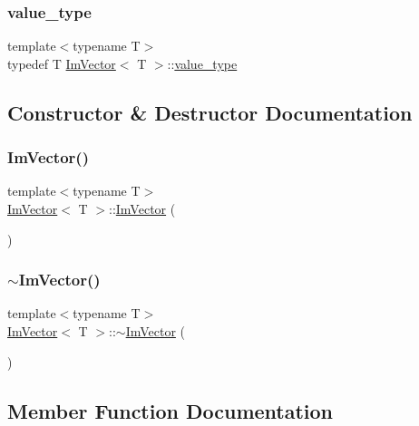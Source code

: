 \subsubsection{\texorpdfstring{value\+\_\+type}{value\_type}}
{\footnotesize\ttfamily template$<$typename T$>$ \\
typedef T \hyperlink{class_im_vector}{Im\+Vector}$<$ T $>$\+::\hyperlink{class_im_vector_a8bd77e4e7581d8e5f9e98d7c2f3c2a80}{value\+\_\+type}}



\subsection{Constructor \& Destructor Documentation}
\hypertarget{class_im_vector_a547fff373659fd848c3ecc6b25a83f25}{}\label{class_im_vector_a547fff373659fd848c3ecc6b25a83f25} 
\subsubsection{\texorpdfstring{Im\+Vector()}{ImVector()}}
{\footnotesize\ttfamily template$<$typename T$>$ \\
\hyperlink{class_im_vector}{Im\+Vector}$<$ T $>$\+::\hyperlink{class_im_vector}{Im\+Vector} (\begin{DoxyParamCaption}{ }\end{DoxyParamCaption})}

\hypertarget{class_im_vector_a9b782359ca26eaa1a6a6138fcf341c54}{}\label{class_im_vector_a9b782359ca26eaa1a6a6138fcf341c54} 
\subsubsection{\texorpdfstring{$\sim$\+Im\+Vector()}{~ImVector()}}
{\footnotesize\ttfamily template$<$typename T$>$ \\
\hyperlink{class_im_vector}{Im\+Vector}$<$ T $>$\+::$\sim$\hyperlink{class_im_vector}{Im\+Vector} (\begin{DoxyParamCaption}{ }\end{DoxyParamCaption})}



\subsection{Member Function Documentation}
\hypertarget{class_im_vector_af9dfc79dfd89c904830bebc492a18310}{}\label{class_im_vector_af9dfc79dfd89c904830bebc492a18310} 
